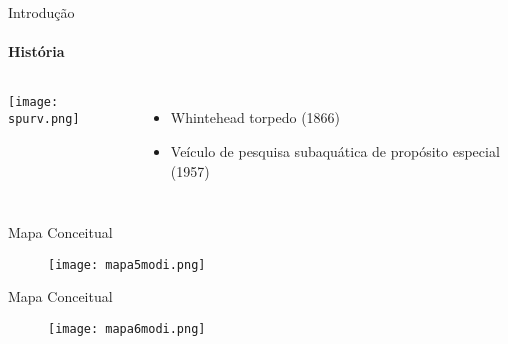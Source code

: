\begin{frame}[t]{Introdução}
    \transboxout[duration=0.5]
    \framesubtitle{História}
    \begin{columns}
            \texttt{[image: spurv.png]}
            \begin{itemize}
               \item Whintehead torpedo (1866)
               \item Veículo de pesquisa subaquática de propósito especial (1957)
            \end{itemize}
    \end{columns}
\end{frame}
\begin{frame}[c]{Mapa Conceitual}
        \begin{figure}
        \texttt{[image: mapa5modi.png]}
    \end{figure}
\end{frame}
\begin{frame}[c]{Mapa Conceitual}
        \begin{figure}
        \texttt{[image: mapa6modi.png]}
    \end{figure}
\end{frame}
